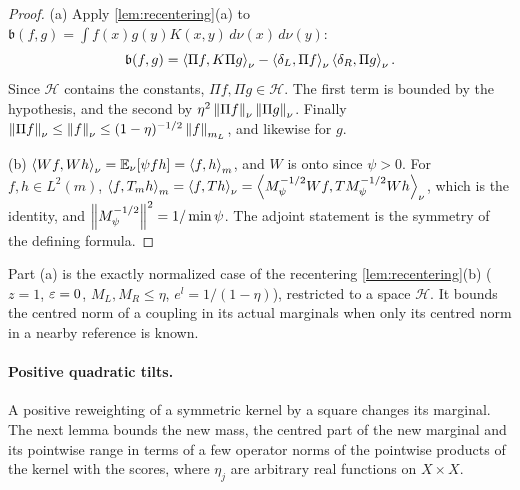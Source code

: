 \begin{proof}
(a) Apply \cref{lem:recentering}(a) to
$\mathfrak b(f,g)=\int f(x)g(y)K(x,y)\,d\nu(x)\,d\nu(y)$:
\[
 \mathfrak b(f,g)=\left\langle \Pi f,K\Pi g\right\rangle_\nu
 -\left\langle \delta_L,\Pi f\right\rangle_\nu\left\langle \delta_R,\Pi g\right\rangle_\nu.
\]
Since $\mathcal H$ contains the constants, $\Pi f,\Pi g\in\mathcal H$.
The first term is bounded by the hypothesis, and the second by
$\eta^2\left\|\Pi f\right\|_\nu\left\|\Pi g\right\|_\nu$. Finally
$\left\|\Pi f\right\|_\nu\le\left\|f\right\|_\nu\le(1-\eta)^{-1/2}\left\|f\right\|_{m_L}$,
and likewise for $g$.

(b) $\left\langle Wf,Wh\right\rangle_\nu=\mathbb E_\nu[\psi fh]=\left\langle f,h\right\rangle_m$, and $W$ is onto since $\psi>0$.
For $f,h\in L^2(m)$,
$\left\langle f,T_mh\right\rangle_m=\left\langle f,Th\right\rangle_\nu=\left\langle M_\psi^{-1/2}Wf,TM_\psi^{-1/2}Wh\right\rangle_\nu$, which
is the identity, and $\left\|M_\psi^{-1/2}\right\|^2=1/\min\psi$. The adjoint
statement is the symmetry of the defining formula.
\end{proof}

Part (a) is the exactly normalized case of the recentering
\cref{lem:recentering}(b) ($z=1$, $\varepsilon=0$, $M_L,M_R\le\eta$,
$e^{l}=1/(1-\eta)$), restricted to a space $\mathcal H$. It bounds the centred
norm of a coupling in its actual marginals when only its centred norm in a
nearby reference is known.

\paragraph{Positive quadratic tilts.}
A positive reweighting of a symmetric kernel by a square changes its marginal.
The next lemma bounds the new mass, the centred part of the new marginal and
its pointwise range in terms of a few operator norms of the pointwise products
of the kernel with the scores, where $\eta_j$ are arbitrary real functions on $X\times X$.

